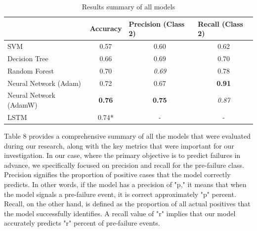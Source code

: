 \documentclass{article}
\begin{document}
\begin{table}[htbp]
\caption{Results summary of all models}
\centering
\begin{tabular}{l|c|c|c|}
\cline{2-4}
                                             & \multicolumn{1}{l|}{Accuracy} & \multicolumn{1}{l|}{Precision (Class 2)} & \multicolumn{1}{l|}{Recall (Class 2)} \\ \hline
\multicolumn{1}{|l|}{SVM}                    & 0.57                          & 0.60                                     & 0.62                                  \\
\multicolumn{1}{|l|}{Decision Tree}          & 0.66                          & 0.69                                     & 0.70                                  \\
\multicolumn{1}{|l|}{Random Forest}          & 0.70                          & \textit{0.69}                            & 0.78                                  \\
\multicolumn{1}{|l|}{Neural Network (Adam)}  & 0.72                          & 0.67                                     & \textbf{0.91}                         \\
\multicolumn{1}{|l|}{Neural Network (AdamW)} & \textbf{0.76}                 & \textbf{0.75}                            & \textit{0.87}                         \\
\multicolumn{1}{|l|}{LSTM}                   & 0.74*                         & -                                    & -                                 \\ \hline
\end{tabular}
\end{table}

Table 8 provides a comprehensive summary of all the models that were evaluated during our research, along with the key metrics that were important for our investigation. In our case, where the primary objective is to predict failures in advance, we specifically focused on precision and recall for the pre-failure class.\\

Precision signifies the proportion of positive cases that the model correctly predicts. In other words, if the model has a precision of "p," it means that when the model signals a pre-failure event, it is correct approximately "p" percent.\\

Recall, on the other hand, is defined as the proportion of all actual positives that the model successfully identifies. A recall value of "r" implies that our model accurately predicts "r" percent of pre-failure events.\\
\end{document}
